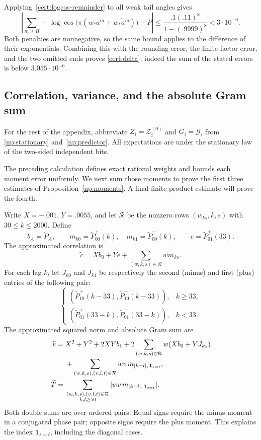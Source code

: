 Applying~\eqref{cert:logcos-remainder} to all weak tail angles gives
\[
 \left|\sum_{m\ge H}-\log\cos
       \bigl(\pi(w_*a^m+\overline{w_*a^m})\bigr)-P\right|
 \le\frac{.1(.11)^8}{1-(.9999)^8}<3\cdot10^{-6}.
\]
Both penalties are nonnegative, so the same bound applies to the
difference of their exponentials.  Combining this with the rounding
error, the finite-factor error, and the two omitted ends proves
\eqref{cert:delta}; indeed the sum of the stated errors is below
$3.055\cdot10^{-6}$.

\subsection{Correlation, variance, and the absolute Gram sum}
\label{cert:moments}\label{cert:moment-proof}

For the rest of the appendix, abbreviate
$Z_i=\mathcal Z_i^{(0)}$ and $G_i=\mathcal G_i$ from
\eqref{np:stationary} and~\eqref{np:predictor}.  All expectations are
under the stationary law of the two-sided independent bits.

The preceding calculation defines exact rational weights and bounds
each moment error uniformly.  We next sum those moments to prove
the first three estimates of Proposition~\ref{np:moments}.  A final
finite-product estimate will prove the fourth.

Write $X=-.001$, $Y=.0055$, and let $\mathcal R$ be the nonzero
rows $(w_{ks},k,s)$ with $30\le k\le2000$.  Define
\[
 b_A=\widetilde P_A,\qquad
 m_{k0}=\widetilde P_{00}^{+}(k),\quad
 m_{k1}=\widetilde P_{00}^{-}(k),\qquad
 e=\widetilde P_{01}^{+}(33).
\]
The approximated correlation is
\begin{equation}\label{cert:corr-sum}
 \widetilde c=Xb_0+Ye+\sum_{(w,k,s)\in\mathcal R}wm_{ks}.
\end{equation}
For each lag $k$, let $J_{k0}$ and $J_{k1}$ be respectively the
second (minus) and first (plus) entries of the following pair:
\[
 \begin{cases}
 (\widetilde P_{10}^{+}(k-33),\widetilde P_{10}^{-}(k-33)),&k\ge33,\\
 (\widetilde P_{01}^{+}(33-k),\widetilde P_{01}^{-}(33-k)),&k<33.
 \end{cases}
\]
The approximated squared norm and absolute Gram sum are
\begin{align}
 \widetilde v={}&X^2+Y^2+2XYb_1
 +2\sum_{(w,k,s)\in\mathcal R}w(Xb_0+YJ_{ks})
 \notag\\[-2pt]
 &+\sum_{(w,k,s),(v,l,t)\in\mathcal R}
           wv\,m_{|k-l|,\,\mathbf1_{s=t}},\label{cert:var-sum}\\
 \widetilde T={}&
 \sum_{\substack{(w,k,s),(v,l,t)\in\mathcal R\\k,l\ge50}}
       |wv\,m_{|k-l|,\,\mathbf1_{s=t}}|.\label{cert:T-sum}
\end{align}
Both double sums are over ordered pairs.  Equal signs require the
minus moment in a conjugated phase pair; opposite signs require the
plus moment.  This explains the index $\mathbf1_{s=t}$, including
the diagonal cases.

